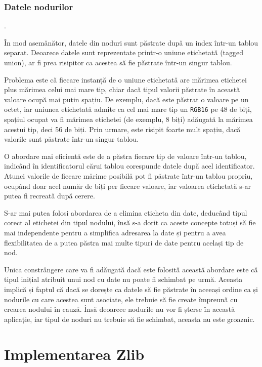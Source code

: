 \documentclass[a4paper,12pt]{report}
\begin{document}
\subsection{Datele nodurilor}.

În mod asemănător, datele din noduri sunt păstrate după un index într-un tablou separat.
Deoarece datele sunt reprezentate printr-o uniune etichetată (tagged union),
ar fi prea risipitor ca acestea să fie păstrate într-un singur tablou.

Problema este că fiecare instanță de o uniune etichetată are
mărimea etichetei plus mărimea celui mai mare tip,
chiar dacă tipul valorii păstrate în această valoare ocupă mai puțin spațiu.
De exemplu, dacă este păstrat o valoare pe un octet,
iar uniunea etichetată admite ca cel mai mare tip un \texttt{RGB16} pe 48 de biți,
spațiul ocupat va fi mărimea etichetei (de exemplu, 8 biți) adăugată la mărimea acestui tip,
deci 56 de biți.
Prin urmare, este risipit foarte mult spațiu, dacă valorile sunt păstrate într-un singur tablou.

O abordare mai eficientă este de a păstra fiecare tip de valoare într-un tablou,
indicând în identificatorul cărui tablou corespunde datele după acel identificator.
Atunci valorile de fiecare mărime posibilă pot fi păstrate într-un tablou propriu,
ocupând doar acel număr de biți per fiecare valoare, 
iar valoarea etichetată s-ar putea fi recreată după cerere.

S-ar mai putea folosi abordarea de a elimina eticheta din date,
deducând tipul corect al etichetei din tipul nodului,
însă s-a dorit ca aceste concepte totuși să fie mai independente pentru
a simplifica adresarea la date și pentru a avea flexibilitatea de
a putea păstra mai multe tipuri de date pentru același tip de nod.

Unica constrângere care va fi adăugată dacă este folosită această abordare este că
tipul inițial atribuit unui nod cu date nu poate fi schimbat pe urmă.
Aceasta implică și faptul că dacă se dorește ca datele să fie păstrate în aceeași ordine ca și
nodurile cu care acestea sunt asociate, ele trebuie să fie create împreună cu crearea nodului în cauză.
Însă deoarece nodurile nu vor fi șterse în această aplicație,
iar tipul de noduri nu trebuie să fie schimbat, aceasta nu este groaznic.


\chapter{Implementarea Zlib}
\end{document}
